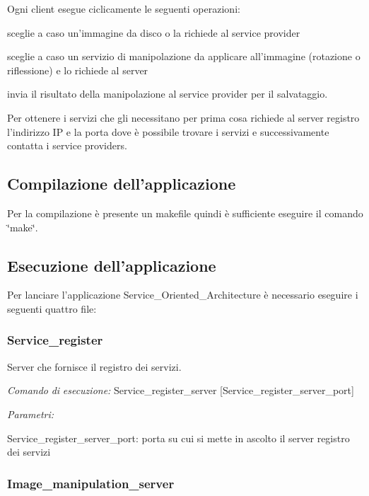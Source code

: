 Ogni client esegue ciclicamente le seguenti operazioni\-:
\begin{DoxyItemize}
\item sceglie a caso un'immagine da disco o la richiede al service provider
\item sceglie a caso un servizio di manipolazione da applicare all'immagine (rotazione o riflessione) e lo richiede al server
\item invia il risultato della manipolazione al service provider per il salvataggio. \par
 Per ottenere i servizi che gli necessitano per prima cosa richiede al server registro l'indirizzo I\-P e la porta dove è possibile trovare i servizi e successivamente contatta i service providers. \par
 \par

\end{DoxyItemize}\hypertarget{index_Compilazione}{}\subsection{Compilazione dell'applicazione}\label{index_Compilazione}
Per la compilazione è presente un makefile quindi è sufficiente eseguire il comando \char`\"{}make\char`\"{}. \par
 \par
\hypertarget{index_Esecuzione}{}\subsection{Esecuzione dell'applicazione}\label{index_Esecuzione}
Per lanciare l'applicazione Service\-\_\-\-Oriented\-\_\-\-Architecture è necessario eseguire i seguenti quattro file\-: \hypertarget{index_Service_register}{}\subsubsection{Service\-\_\-register}\label{index_Service_register}
Server che fornisce il registro dei servizi. \par
 {\itshape Comando} {\itshape di} {\itshape esecuzione\-:} Service\-\_\-register\-\_\-server \mbox{[}Service\-\_\-register\-\_\-server\-\_\-port\mbox{]} \par
 {\itshape Parametri\-:} 
\begin{DoxyItemize}
\item Service\-\_\-register\-\_\-server\-\_\-port\-: porta su cui si mette in ascolto il server registro dei servizi
\end{DoxyItemize}\hypertarget{index_Image_manipulation_server}{}\subsubsection{Image\-\_\-manipulation\-\_\-server}\label{index_Image_manipulation_server}
